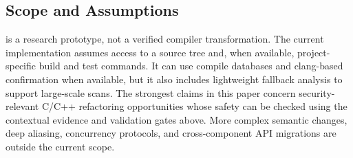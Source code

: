 \subsection{Scope and Assumptions}
\label{sec:prelim-scope}

\SysName{} is a research prototype, not a verified compiler transformation. The
current implementation assumes access to a source tree and, when available,
project-specific build and test commands. It can use compile databases and
clang-based confirmation when available, but it also includes lightweight
fallback analysis to support large-scale scans. The strongest claims in this
paper concern security-relevant C/C++ refactoring opportunities whose safety can
be checked using the contextual evidence and validation gates above. More complex
semantic changes, deep aliasing, concurrency protocols, and cross-component API
migrations are outside the current scope.
